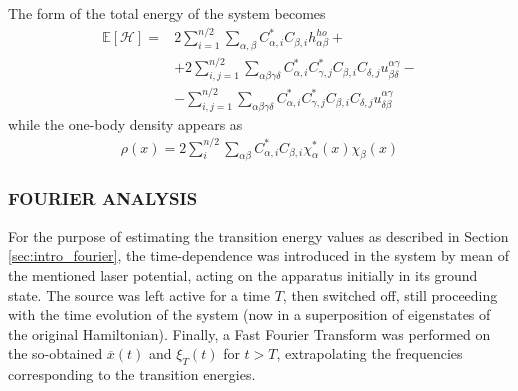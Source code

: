 The form of the total energy of the system becomes
\begin{align*}
    \mathbb{E}[\mathcal{H}] =& 2\sum_{i=1}^{n/2} \sum_{\alpha,\beta} C_{\alpha,i}^* C_{\beta,i} h_{\alpha\beta}^{ho} + \\
    & + 2 \sum_{i,j=1}^{n/2} \sum_{\alpha\beta\gamma\delta} C_{\alpha,i}^* C_{\gamma,j}^* C_{\beta,i} C_{\delta,j}  u^{\alpha\gamma}_{\beta\delta} - \\
    & - \sum_{i,j=1}^{n/2} \sum_{\alpha\beta\gamma\delta} C_{\alpha,i}^* C_{\gamma,j}^* C_{\beta,i} C_{\delta,j}  u^{\alpha\gamma}_{\delta\beta}
\end{align*}
while the one-body density appears as
\begin{align*}
    \rho(x) = 2 \sum_i^{n/2} \sum_{\alpha\beta} C_{\alpha,i}^* C_{\beta,i} \chi_{\alpha}^*(x) \chi_{\beta}(x)
\end{align*}



\subsubsection{FOURIER ANALYSIS}
\label{sec:fourier_analysis}
For the purpose of estimating the transition energy values as described in Section \ref{sec:intro_fourier}, the time-dependence was introduced in the system by mean of the mentioned laser potential, acting on the apparatus initially in its ground state. The source was left active for a time $T$, then switched off, still proceeding with the time evolution of the system (now in a superposition of eigenstates of the original Hamiltonian). Finally, a Fast Fourier Transform was performed on the so-obtained $\overline{x}(t)$ and $\xi_T(t)$ for $t>T$, extrapolating the frequencies corresponding to the transition energies.



